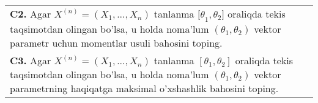 \documentclass{article}
\begin{document}
\begin{tabular}{m{17cm}}
\\
\textbf{C2.} 
Agar \(X^{(n)} = \left( X_{1},...,X_{n} \right)\) tanlanma \({\lbrack\theta}_{1},\theta_{2}\rbrack\) oraliqda tekis taqsimotdan olingan bo'lsa, u holda noma'lum \(\left( \theta_{1},\theta_{2} \right)\) vektor parametr uchun momentlar usuli bahosini toping.
\\
\textbf{C3.} 
Agar \(X^{(n)} = \left( X_{1},...,X_{n} \right)\) tanlanma \(\left\lbrack \theta_{1},\theta_{2} \right\rbrack\) oraliqda tekis taqsimotdan olingan bo'lsa, u holda noma'lum \(\left( \theta_{1},\theta_{2} \right)\) vektor parametrning haqiqatga maksimal o'xshashlik bahosini toping.
\\

\end{tabular}
\vspace{1cm}
\end{document}
